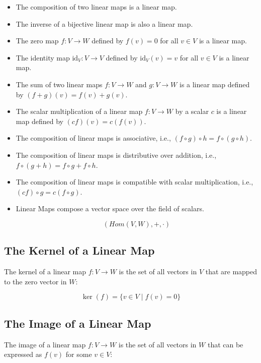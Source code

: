 \begin{itemize}
    \item The composition of two linear maps is a linear map.
    \item The inverse of a bijective linear map is also a linear map.
    \item The zero map \( f: V \to W \) defined by \( f(v) = 0 \) 
          for all \( v \in V \) is a linear map.
    \item The identity map \( \text{id}_V: V \to V \) defined by \( \text{id}_V(v) = v \) for all 
          \( v \in V \) is a linear map.
    \item The sum of two linear maps \( f: V \to W \) 
          and \( g: V \to W \) is a linear map defined by \( (f + g)(v) = f(v) + g(v) \).
    \item The scalar multiplication of a linear map \( f: V \to W \) by a scalar \( c \) is a linear 
          map defined by \( (cf)(v) = c(f(v)) \).
    \item The composition of linear maps is associative, i.e., \( (f \circ g) \circ h = f \circ (g \circ h) \).
    \item The composition of linear maps is distributive over addition, i.e., 
          \( f \circ (g + h) = f \circ g + f \circ h \).
    \item The composition of linear maps is compatible with scalar multiplication, i.e., 
          \( (cf) \circ g = c(f \circ g) \).
    \item Linear Maps compose a vector space 
          over the field of scalars.
          
          \[
            (Hom(V,W), +, \cdot )
          \]
\end{itemize}

\subsection{The Kernel of a Linear Map}

The kernel of a linear map \( f: V \to W \) is the set of all vectors in \( V \) that are mapped to 
the zero vector in \( W \):

\[
    \ker(f) = \{ v \in V \mid f(v) = 0 \}
\]

\subsection{The Image of a Linear Map}

The image of a linear map \( f: V \to W \) is the set of all vectors in \( W \) that can be expressed 
as \( f(v) \) for some \( v \in V \):

